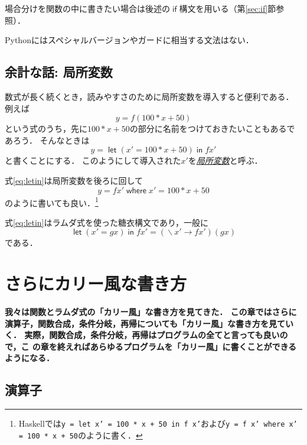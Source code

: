 \documentclass[a5paper,draft]{jsbook}
\newcommand{\programminglanguage}[1]{\textsf{#1}}
\newcommand{\haskell}{\programminglanguage{Haskell}}
\newcommand{\python}{\programminglanguage{Python}}
\newenvironment{leader}{\begingroup\bf}{\endgroup}
\newcommand{\keyword}[1]{{\underline{\emph{#1}}}}
\newcommand{\code}[1]{\texttt{#1}}
\DeclareMathOperator{\mathLambda}{\backslash}
\newcommand{\mathLambdaArrow}{\rightarrow}
\newcommand{\mathKeyword}[1]{\operatorname{\textsf{#1}}}
\newcommand{\mathIf}{\mathKeyword{if}}
\newcommand{\mathLetLet}{\mathKeyword{let}}
\newcommand{\mathLetIn}{\mathKeyword{in}}
\newcommand{\mathWhere}{\mathKeyword{where}}
\newcommand{\mathLambdaExpression}[2]{\mathLambda#1\mathLambdaArrow#2}
\newcommand{\mathLet}[2]{\mathLetLet#1\mathLetIn#2}
\begin{document}
場合分けを関数の中に書きたい場合は後述の$\mathIf$構文を用いる（第\ref{sec:if}節参照）．

\python にはスペシャルバージョンやガードに相当する文法はない．

\section{余計な話: 局所変数}

数式が長く続くとき，読みやすさのために局所変数を導入すると便利である．
例えば
\begin{equation}
y=f\left(100*x+50\right)
\end{equation}
という式のうち，先に$100*x+50$の部分に名前をつけておきたいこともあるであろう．
そんなときは
\begin{equation}
\label{eq:letin}
y=\mathLet{\left(x'=100*x+50\right)}{fx'}
\end{equation}
と書くことにする．
このようにして導入された$x'$を\keyword{局所変数}と呼ぶ．

式\eqref{eq:letin}は局所変数を後ろに回して
\begin{equation}
y=fx'\mathWhere x'=100*x+50
\end{equation}
のように書いても良い．\footnote{\haskell では\code{y = let x' = 100 * x + 50 in f x'}および\code{y = f x' where x' = 100 * x + 50}のように書く．}

式\eqref{eq:letin}はラムダ式を使った糖衣構文であり，一般に
\begin{equation}
\mathLet{\left(x'=gx\right)}{fx'}=(\mathLambdaExpression{x'}{fx'})(gx)
\end{equation}
である．

\chapter{さらにカリー風な書き方}

\begin{leader}
我々は関数とラムダ式の「カリー風」な書き方を見てきた．
この章ではさらに演算子，関数合成，条件分岐，再帰についても「カリー風」な書き方を見ていく．
実際，関数合成，条件分岐，再帰はプログラムの全てと言っても良いので，こ
の章を終えればあらゆるプログラムを「カリー風」に書くことができるようになる．
\end{leader}

\section{演算子}
\end{document}
